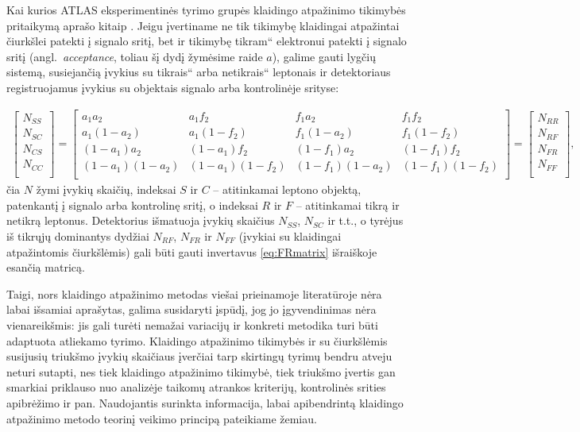 \documentclass[a4paper, 12pt, oneside]{article}
\newcommand{\ltq}[1]{{\quotedblbase{}#1\textquotedblleft{}}}
\newlength\q
\begin{document}
Kai kurios ATLAS eksperimentinės tyrimo grupės klaidingo atpažinimo tikimybės pritaikymą aprašo kitaip \cite{DY_ATLAS2016, Z'_ATLAS2014}.
Jeigu įvertiname ne tik tikimybę klaidingai atpažintai čiurkšlei patekti į signalo sritį, bet ir tikimybę \ltq{tikram}
elektronui patekti į signalo sritį (angl.\ \textit{acceptance}, toliau šį dydį žymėsime raide $a$), galime gauti lygčių sistemą,
susiejančią įvykius su \ltq{tikrais} arba \ltq{netikrais} leptonais ir detektoriaus registruojamus įvykius su objektais signalo
arba kontrolinėje srityse:

\begin{align}
\label{eq:FRmatrix}
	\begin{bmatrix}
		N_{SS} \\		
		N_{SC} \\
		N_{CS} \\
		N_{CC} \\
	\end{bmatrix}
	=
	\begin{bmatrix}
		a_1a_2 & a_1f_2 & f_1a_2 & f_1f_2 \\
		a_1(1-a_2) & a_1(1-f_2) & f_1(1-a_2) & f_1(1-f_2) \\
		(1-a_1)a_2 & (1-a_1)f_2 & (1-f_1)a_2 & (1-f_1)f_2 \\
		(1-a_1)(1-a_2) & (1-a_1)(1-f_2) & (1-f_1)(1-a_2) & (1-f_1)(1-f_2) \\
	\end{bmatrix}
	=
	\begin{bmatrix}
		N_{RR} \\
		N_{RF} \\
		N_{FR} \\
		N_{FF} \\
	\end{bmatrix}
	\! ,
\end{align}
čia $N$ žymi įvykių skaičių, indeksai $S$ ir $C$ -- atitinkamai leptono objektą, patenkantį į signalo arba kontrolinę sritį,
o indeksai $R$ ir $F$ -- atitinkamai tikrą ir netikrą leptonus.
Detektorius išmatuoja įvykių skaičius $N_{SS}$, $N_{SC}$ ir t.t., o tyrėjus iš tikrųjų dominantys dydžiai $N_{RF}$, $N_{FR}$ ir
$N_{FF}$ (įvykiai su klaidingai atpažintomis čiurkšlėmis) gali būti gauti invertavus \eqref{eq:FRmatrix} išraiškoje esančią matricą.

Taigi, nors klaidingo atpažinimo metodas viešai prieinamoje literatūroje nėra labai išsamiai aprašytas, galima susidaryti įspūdį, jog
jo įgyvendinimas nėra vienareikšmis: jis gali turėti nemažai variacijų ir konkreti metodika turi būti adaptuota atliekamo tyrimo.
Klaidingo atpažinimo tikimybės ir su čiurkšlėmis susijusių triukšmo įvykių skaičiaus įverčiai tarp skirtingų tyrimų bendru atveju neturi
sutapti, nes tiek klaidingo atpažinimo tikimybė, tiek triukšmo įvertis gan smarkiai priklauso nuo analizėje taikomų atrankos kriterijų,
kontrolinės srities apibrėžimo ir pan.
Naudojantis surinkta informacija, labai apibendrintą klaidingo atpažinimo metodo teorinį veikimo principą pateikiame žemiau.
\end{document}
